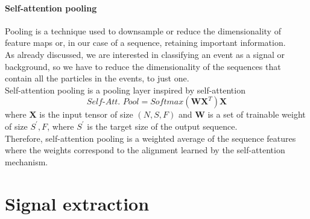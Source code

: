 \paragraph*{Self-attention pooling}


Pooling is a technique used to downsample or reduce the dimensionality of feature maps or, in our case of a sequence, retaining important information.\\
As already discussed, we are interested in classifying an event as a signal or background, so we have to reduce the dimensionality of the sequences that contain all the particles in the events, to just one.\\
Self-attention pooling \cite{Safari2020Self-attentionRecognition} is a pooling layer inspired by self-attention
\begin{equation}
    \textit{Self-Att. Pool}=\textit{Softmax}(\bm{W} \bm{X}^T)\bm{X}
\end{equation}
where $\bm{X}$ is the input tensor of size $(N,S,F)$ and $\bm{W}$ is a set of trainable weight of size $S^{'},F$, where $S^{'}$ is the target size of the output sequence.\\
Therefore, self-attention pooling is a weighted average of the sequence features where the weights correspond to the alignment learned by the self-attention mechanism.













\newpage
\section{Signal extraction}
